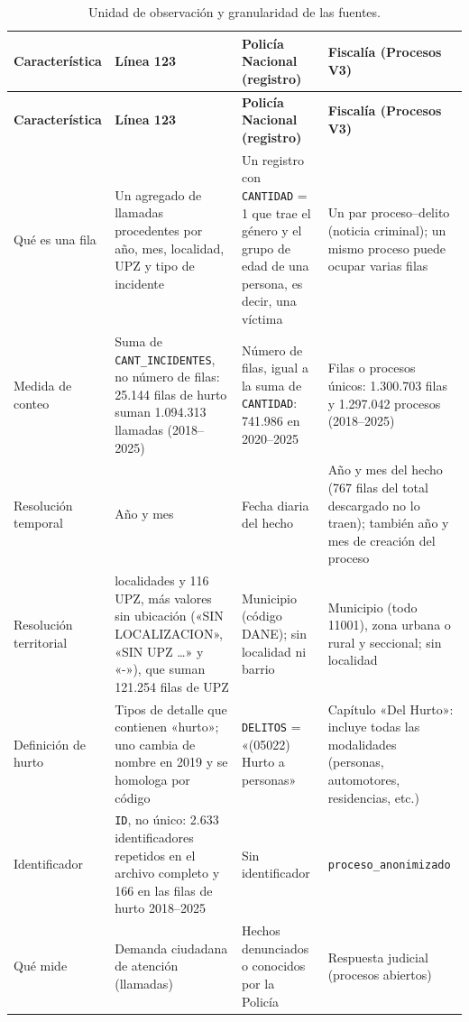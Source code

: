 \documentclass[12pt,letterpaper]{article}
\begin{document}
{\small
\setlength{\tabcolsep}{4pt}
\begin{longtable}{@{}>{\raggedright\arraybackslash}p{2.6cm}>{\raggedright\arraybackslash}p{4.2cm}>{\raggedright\arraybackslash}p{4.0cm}>{\raggedright\arraybackslash}p{4.2cm}@{}}
\caption{Unidad de observación y granularidad de las fuentes.}\label{tab:compatibilidad}\\
\toprule
\textbf{Característica} & \textbf{Línea 123} & \textbf{Policía Nacional (registro)} & \textbf{Fiscalía (Procesos V3)} \\
\midrule
\endfirsthead
\toprule
\textbf{Característica} & \textbf{Línea 123} & \textbf{Policía Nacional (registro)} & \textbf{Fiscalía (Procesos V3)} \\
\midrule
\endhead
\bottomrule
\endfoot
Qué es una fila & Un agregado de llamadas procedentes por año, mes, localidad, UPZ y tipo de incidente & Un registro con \texttt{CANTIDAD} = 1 que trae el género y el grupo de edad de una persona, es decir, una víctima & Un par proceso--delito (noticia criminal); un mismo proceso puede ocupar varias filas \\
\addlinespace
Medida de conteo & Suma de \texttt{CANT\_INCIDENTES}, no número de filas: 25.144 filas de hurto suman 1.094.313 llamadas (2018--2025) & Número de filas, igual a la suma de \texttt{CANTIDAD}: 741.986 en 2020--2025 & Filas o procesos únicos: 1.300.703 filas y 1.297.042 procesos (2018--2025) \\
\addlinespace
Resolución temporal & Año y mes & Fecha diaria del hecho & Año y mes del hecho (767 filas del total descargado no lo traen); también año y mes de creación del proceso \\
\addlinespace
Resolución territorial & 20 localidades y 116 UPZ, más valores sin ubicación («SIN LOCALIZACION», «SIN UPZ \ldots» y «-»), que suman 121.254 filas de UPZ & Municipio (código DANE); sin localidad ni barrio & Municipio (todo 11001), zona urbana o rural y seccional; sin localidad \\
\addlinespace
Definición de hurto & Tipos de detalle que contienen «hurto»; uno cambia de nombre en 2019 y se homologa por código & \texttt{DELITOS} = «(05022) Hurto a personas» & Capítulo «Del Hurto»: incluye todas las modalidades (personas, automotores, residencias, etc.) \\
\addlinespace
Identificador & \texttt{ID}, no único: 2.633 identificadores repetidos en el archivo completo y 166 en las filas de hurto 2018--2025 & Sin identificador & \texttt{proceso\_anonimizado} \\
\addlinespace
Qué mide & Demanda ciudadana de atención (llamadas) & Hechos denunciados o conocidos por la Policía & Respuesta judicial (procesos abiertos) \\
\end{longtable}
}
\end{document}
